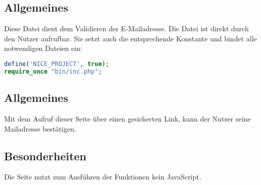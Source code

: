\subsection{Allgemeines} Diese Datei dient dem Validieren der E-Mailadresse.
Die Datei ist direkt durch den Nutzer aufrufbar. Sie setzt auch die entsprechende Konstante und bindet alle notwendigen Dateien ein:
\begin{lstlisting}[language=php]
define('NICE_PROJECT', true);
require_once "bin/inc.php";
\end{lstlisting}
\subsection{Allgemeines}
Mit dem Aufruf dieser Seite über einen gesicherten Link, kann der Nutzer seine Mailadresse bestätigen.
\subsection{Besonderheiten}
Die Seite nutzt zum Ausführen der Funktionen kein JavaScript.
